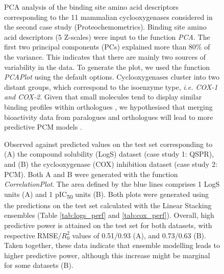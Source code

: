 \documentclass{bmcart}
\begin{document}
\begin{backmatter}
\begin{figure}[h!]
  \caption{
      PCA analysis of the binding site amino acid descriptors corresponding to the 11 mammalian cyclooxygenases
considered in the second case study (Proteochemometrics).
Binding site amino acid descriptors (5 Z-scales) were input to the function {\it PCA}.
The first two principal components (PCs) explained more than 80\% of the variance.
This indicates that there are mainly two sources of variability in the data.
To generate the plot, we used the function {\it PCAPlot} using the default options.
Cyclooxygenases cluster into two distant groups,
which correspond to the isoenzyme type, {\it i.e. COX-1 and COX-2}.
Given that small molecules tend to display similar binding profiles within orthologues \cite{krueger},
we hypothesised that merging bioactivity data from paralogues and orthologues will lead to more predictive PCM models \cite{cortesCOX}.}
      \end{figure}
    
\begin{figure}[h!]
  \caption{
      Observed against predicted values on the test set corresponding to 
(A) the compound solubility (LogS) dataset (case study 1: QSPR),
and (B) the cyclooxygenase (COX) inhibition dataset (case study 2: PCM).
Both A and B were generated with the function {\it CorrelationPlot}.
The area defined by the blue lines comprises 1 LogS units (A) and 1 pIC\textsubscript{50} units (B).
Both plots were generated using the predictions on the test set calculated with the Linear Stacking ensembles (Table \ref{tab:logs_perf} and \ref{tab:cox_perf}).
Overall, high predictive power is attained on the test set for both datasets, 
with respective RMSE/$R_{0}^2$ values of 0.51/0.93 (A), and 0.73/0.63 (B).
Taken together, these data indicate that ensemble modelling leads to higher predictive power, 
although this increase might be marginal for some datasets (B).}
      \end{figure}



\end{backmatter}
\end{document}
